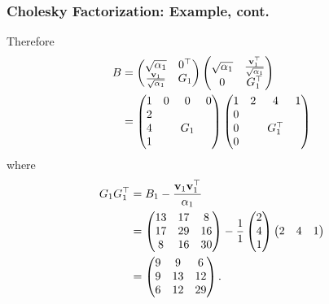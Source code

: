 \documentclass{beamer}
\begin{document}
\begin{frame}\frametitle{Cholesky Factorization: Example, cont.}
	Therefore
	\begin{align*}
		B &= \begin{pmatrix}
 				\sqrt{\alpha_1} & 0^\top \\ \frac{\mathbf{v}_1}{\sqrt{\alpha_1}} & G_1
 			 \end{pmatrix}
 			 \begin{pmatrix}
 				\sqrt{\alpha_1} & \frac{\mathbf{v}_1^\top}{\sqrt{\alpha_1}} \\ 0 & G_1^\top
 			 \end{pmatrix} \\
 		&= \begin{pmatrix}
				1 & 0 & 0 & 0 \\
				2 &   &   &   \\
				4 &   & G_1 & \\
				1 &   &   & 
			\end{pmatrix}
			\begin{pmatrix}
				1 & 2 & 4 & 1 \\
				0 &   &   &   \\
				0 &   & G_1^\top & \\
				0 &   &   & 
			\end{pmatrix}
	\end{align*}
	where
	\begin{align*}
		G_1 G_1^\top &= B_1 - \frac{\mathbf{v}_1 \mathbf{v}_1^\top}{\alpha_1} \\
		&= \begin{pmatrix}
 				13 & 17 & 8 \\
 				17 & 29 & 16 \\
 				8 & 16 & 30	
 			\end{pmatrix}
 			- \frac{1}{1}\begin{pmatrix} 2 \\ 4 \\ 1 \end{pmatrix}
 			  \begin{pmatrix} 2 & 4 & 1 \end{pmatrix} \\
 		&= 	\begin{pmatrix}
 				9 & 9 & 6 \\ 9 & 13 & 12 \\ 6 & 12 & 29
 			\end{pmatrix}.
	\end{align*}
\end{frame}
\end{document}
